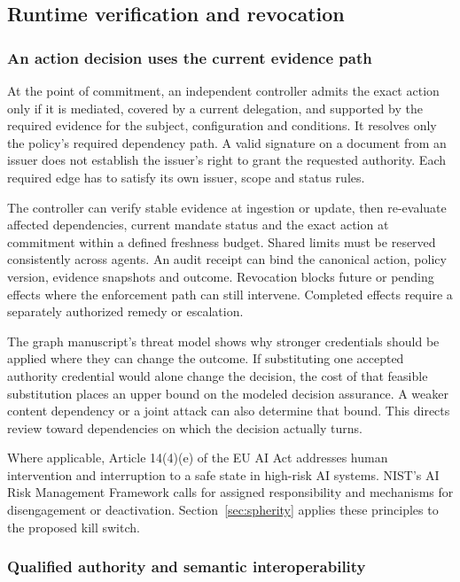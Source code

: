 \subsection{Runtime verification and revocation}

\subsubsection{An action decision uses the current evidence path}

At the point of commitment, an independent controller admits the exact action only if it is mediated, covered by a current delegation, and supported by the required evidence for the subject, configuration and conditions. It resolves only the policy's required dependency path. A valid signature on a document from an issuer does not establish the issuer's right to grant the requested authority. Each required edge has to satisfy its own issuer, scope and status rules.~\cite{src2,src5,src6,src12}

The controller can verify stable evidence at ingestion or update, then re-evaluate affected dependencies, current mandate status and the exact action at commitment within a defined freshness budget. Shared limits must be reserved consistently across agents. An audit receipt can bind the canonical action, policy version, evidence snapshots and outcome. Revocation blocks future or pending effects where the enforcement path can still intervene. Completed effects require a separately authorized remedy or escalation.~\cite{src5,src7,src20}

The graph manuscript's threat model shows why stronger credentials should be applied where they can change the outcome. If substituting one accepted authority credential would alone change the decision, the cost of that feasible substitution places an upper bound on the modeled decision assurance. A weaker content dependency or a joint attack can also determine that bound. This directs review toward dependencies on which the decision actually turns.~\cite{src6}

Where applicable, Article 14(4)(e) of the EU AI Act addresses human intervention and interruption to a safe state in high-risk AI systems. NIST's AI Risk Management Framework calls for assigned responsibility and mechanisms for disengagement or deactivation. Section~\ref{sec:spherity} applies these principles to the proposed kill switch.~\cite{src3,src98}

\subsubsection{Qualified authority and semantic interoperability}

